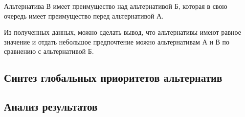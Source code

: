 Альтернатива В имеет преимущество над альтернативой Б, которая в свою очередь имеет преимущество перед альтернативой А.

Из полученных данных, можно сделать вывод, что альтернативы имеют равное значение и отдать небольшое предпочтение можно альтернативам А и В по сравнению с альтернативой Б.

\subsection{Синтез глобальных приоритетов альтернатив}

\subsection{Анализ результатов}

\clearpage
